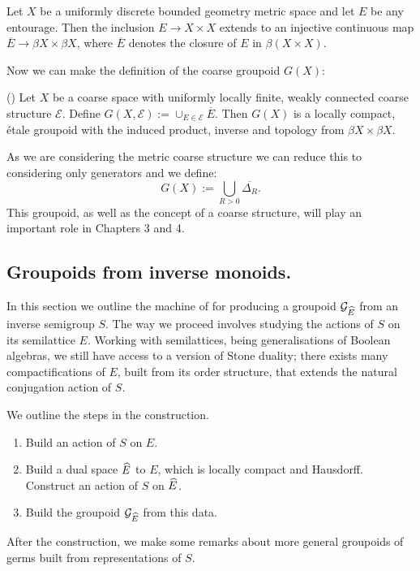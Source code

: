 \begin{example}
\begin{lemma}\label{Lem:CorRoe2}
Let $X$ be a uniformly discrete bounded geometry metric space and let $E$ be any entourage. Then the inclusion $E \rightarrow X \times X$ extends to an injective continuous map $\overline{E} \rightarrow \beta X \times \beta X$, where $\overline{E}$ denotes the closure of $E$ in $\beta(X \times X)$.
\end{lemma}
Now we can make the definition of the coarse groupoid $G(X)$:
\begin{theorem}(\cite[Theorem 10.20]{MR2007488})
Let $X$ be a coarse space with uniformly locally finite, weakly connected coarse structure $\mathcal{E}$. Define $G(X,\mathcal{E}):=\cup_{E\in \mathcal{E}}\overline{E}.$ Then $G(X)$ is a locally compact, \'etale groupoid with the induced product, inverse and topology from $\beta X \times \beta X$.
\end{theorem}
As we are considering the metric coarse structure we can reduce this to considering only generators and we define:
\begin{equation*}
G(X):=\bigcup_{R>0}\overline{\Delta_{R}}.
\end{equation*}
This groupoid, as well as the concept of a coarse structure, will play an important role in Chapters 3 and 4.

\subsection{Groupoids from inverse monoids.}\label{sect:semitogrpoid}
In this section we outline the machine of \cite{MR1724106,MR2419901} for producing a groupoid $\mathcal{G}_{\widehat{E}}$ from an inverse semigroup $S$. The way we proceed involves studying the actions of $S$ on its semilattice $E$. Working with semilattices, being generalisations of Boolean algebras, we still have access to a version of Stone duality; there exists many compactifications of $E$, built from its order structure, that extends the natural conjugation action of $S$. 

We outline the steps in the construction.
\begin{enumerate}
\item Build an action of $S$ on $E$.
\item Build a dual space $\widehat{E}$ to $E$, which is locally compact and Hausdorff. Construct an action of $S$ on $\widehat{E}$.
\item Build the groupoid $\mathcal{G}_{\widehat{E}}$ from this data.
\end{enumerate}
After the construction, we make some remarks about more general groupoids of germs built from representations of $S$.


\end{example}
